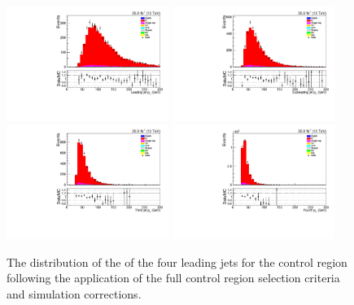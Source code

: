 \begin{figure}[htbp]
\centering
\includegraphics[width=0.47\textwidth]{figs/background-estimation/plots/unblinded/ttbar_control/leadingJetPt_SingleTop_wMass_emu.pdf}
\includegraphics[width=0.47\textwidth]{figs/background-estimation/plots/unblinded/ttbar_control/secondJetPt_SingleTop_wMass_emu.pdf}
\\
\includegraphics[width=0.47\textwidth]{figs/background-estimation/plots/unblinded/ttbar_control/thirdJetPt_SingleTop_wMass_emu.pdf}
\includegraphics[width=0.47\textwidth]{figs/background-estimation/plots/unblinded/ttbar_control/fourthJetPt_SingleTop_wMass_emu.pdf}
\caption{
The distribution of the \pt of the four leading jets for the \ttbar control region following the application of the full control region selection criteria and simulation corrections.
}
\label{fig:ttbarCR_jetPt}
\end{figure}

